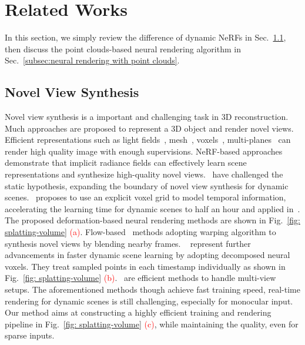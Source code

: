 \documentclass[10pt,twocolumn,letterpaper]{article}
\begin{document}
\section{Related Works}
In this section, we simply review the difference of dynamic NeRFs in Sec.~\ref{subsec:dynamic novel view synthesis}, then discuss the point clouds-based neural rendering algorithm in Sec.~\ref{subsec:neural rendering with point clouds}.

\subsection{Novel View Synthesis}
\label{subsec:dynamic novel view synthesis}
Novel view synthesis is a important and challenging task in 3D reconstruction. Much approaches are proposed to represent a 3D object and render novel views. Efficient representations such as light fields~\cite{broxton2020immersive}, mesh~\cite{collet2015high,li20184d,guo2015robust,su2020robustfusion}, voxels~\cite{guo2019relightables,hu2022hvtr,li2017robust}, multi-planes~\cite{flynn2019deepview} can render high quality image with enough supervisions. NeRF-based approaches~\cite{mildenhall2021nerf,barron2021mip,zhang2020nerf++} demonstrate that implicit radiance fields can effectively learn scene representations and synthesize high-quality novel views.~\cite{pumarola2021dnerf,park2021nerfies,park2021hypernerf} have challenged the static hypothesis, expanding the boundary of novel view synthesis for dynamic scenes.~\cite{tineuvox} proposes to use an explicit voxel grid to model temporal information, accelerating the learning time for dynamic scenes to half an hour and applied in~\cite{gneuvox,robustdynamicradiancefields,guo2023forwardflowfornvs}. The proposed deformation-based neural rendering methods are shown in Fig.~\ref{fig: splatting-volume} \textcolor{red} {(a)}. Flow-based~\cite{gao2021dynamic,tian2023mononerf,li2021neural,robustdynamicradiancefields,zhou2024dynpoint} methods adopting warping algorithm to synthesis novel views by blending nearby frames. ~\cite{li2022neural,hexplane,kplanes,tensor4d,msth,gan2023v4d} represent further advancements in faster dynamic scene learning by adopting decomposed neural voxels. They treat sampled points in each timestamp individually as shown in Fig.~\ref{fig: splatting-volume} \textcolor{red} {(b)}.~\cite{wang2023neus2,gao2022mps,mlpmaps,xu2022multigeometric,lin2023im4d,wang2023mixedvoxels} are efficient methods to handle multi-view setups. The aforementioned methods though achieve fast training speed, real-time rendering for dynamic scenes is still challenging, especially for monocular input. Our method aims at constructing a highly efficient training and rendering pipeline in Fig.~\ref{fig: splatting-volume} \textcolor{red} {(c)}, while maintaining the quality, even for sparse inputs.
\end{document}
